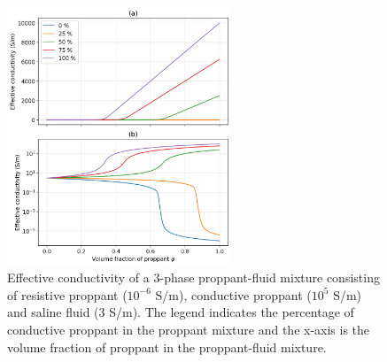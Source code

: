 \begin{figure}
    \begin{center}
    \includegraphics[width=0.6\textwidth]{figures/phys_prop_model/emt_3phase.png}
    \end{center}
\caption{
    Effective conductivity of a 3-phase proppant-fluid mixture consisting of
    resistive proppant ($10^{-6}$ S/m), conductive proppant ($10^5$ S/m) and saline
    fluid (3 S/m). The legend indicates the percentage of conductive proppant in the
    proppant mixture and the x-axis is the volume fraction of proppant in the
    proppant-fluid mixture.
}
\label{fig:emt_3phase}
\end{figure}
